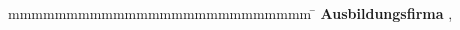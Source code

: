 
\begin{titlepage}
	\enlargethispage{20mm}
	\begin{center}
	  \vspace*{12mm}	\huge \textbf{\titel}\\
	  \vspace*{12mm}	{\large\bf \arbeit}\\
	  \vspace*{3mm} 	{\large\bf \autor}\\
	\end{center}
	\vfill
	\begin{spacing}{1.2}
	\begin{tabbing}
		mmmmmmmmmmmmmmmmmmmmmmmmmm     \= \kill
		\textbf{Ausbildungsfirma}      \>  \firma, \firmenort\\
	\end{tabbing}
	\end{spacing}
\end{titlepage}
